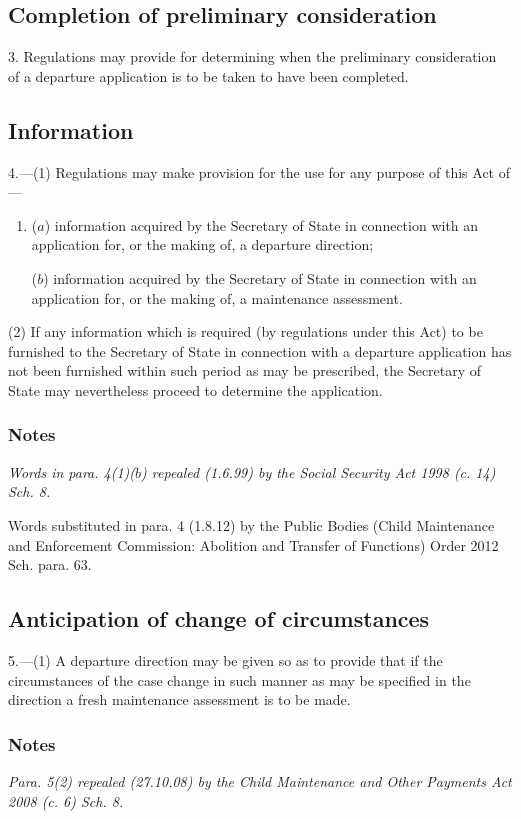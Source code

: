 \documentclass[a4paper]{article}
\newcommand\amendment[1]{\subsubsection*{Notes}{\itshape\frenchspacing\footnotesize #1 \par}}
\begin{document}
{\subsection*{Completion of preliminary consideration}

3. Regulations may provide for determining when the preliminary consideration of a departure application is to be taken to have been completed.

\subsection*{Information}

4.—(1) Regulations may make provision for the use for any purpose of this Act of---
\begin{enumerate}\item[]
($a$) information acquired by the Secretary of State in connection with an
application for, or the making of, a departure direction;

($b$) information acquired by the Secretary of State in connection with
an application for, or the making of, a maintenance assessment.
\end{enumerate}

(2) If any information which is required (by regulations under this Act) to be furnished to the Secretary of State in connection with a departure application has not been furnished within such period as may be prescribed, the Secretary of State may nevertheless proceed to determine the application.

\amendment{
Words in para. 4(1)($b$) repealed (1.6.99) by the Social Security Act 1998 (c. 14) Sch. 8.

Words substituted in para. 4 (1.8.12) by the Public Bodies (Child Maintenance and Enforcement Commission: Abolition and Transfer of Functions) Order 2012 Sch. para. 63.
}

\subsection*{Anticipation of change of circumstances}

5.—(1) A departure direction may be given so as to provide that if the circumstances of the case change in such manner as may be specified in the direction a fresh maintenance assessment is to be made.

\amendment{
Para. 5(2) repealed (27.10.08) by the Child Maintenance and Other Payments Act 2008 (c. 6) Sch. 8.

}}
\end{document}
